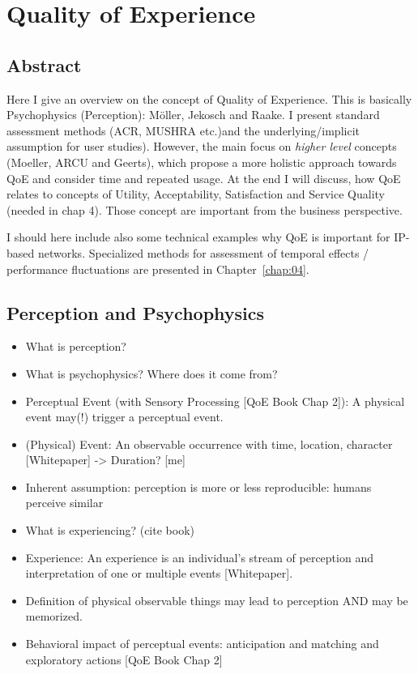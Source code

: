 \chapter{Quality of Experience}
\section*{Abstract}
Here I give an overview on the concept of Quality of Experience.
This is basically Psychophysics (Perception): Möller, Jekosch and Raake.
I present standard assessment methods (ACR, MUSHRA etc.)and the underlying/implicit assumption for user studies).
However, the main focus on \textit{higher level} concepts (Moeller, ARCU and Geerts), which propose a more holistic approach towards QoE and consider time and repeated usage.
At the end I will discuss, how QoE relates to concepts of Utility, Acceptability, Satisfaction and Service Quality (needed in chap 4).
Those concept are important from the business perspective.

I should here include also some technical examples why QoE is important for IP-based networks.
Specialized methods for assessment of temporal effects / performance fluctuations are presented in Chapter~\ref{chap:04}.

\section{Perception and Psychophysics}
\begin{itemize}
\item What is perception?
\item What is psychophysics? Where does it come from?
\item Perceptual Event (with Sensory Processing [QoE Book Chap 2]): A physical event may(!) trigger a perceptual event.
\item (Physical) Event: An observable occurrence with time, location, character [Whitepaper] -> Duration? [me]
\item Inherent assumption: perception is more or less reproducible: humans perceive similar

\item What is experiencing? (cite book)
\item Experience: An experience is an individual's stream of perception and interpretation of one or multiple events [Whitepaper].
\item Definition of physical observable things may lead to perception AND may be memorized.
\item Behavioral impact of perceptual events: anticipation and matching and exploratory actions [QoE Book Chap 2]
\end{itemize}

